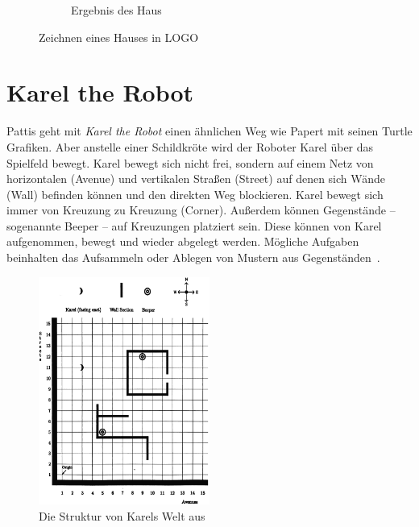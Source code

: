 \begin{figure}
\begin{subfigure}[b]{0.3\textwidth}
        \caption{Ergebnis des Haus}
        \label{fig:related:turtle:house:result}
    \end{subfigure}
    \caption{Zeichnen eines Hauses in LOGO}
    \label{fig:related:turtle:square}
\end{figure}

\section{Karel the Robot}
\label{sec:related:karel}

Pattis geht mit \textit{Karel the Robot} einen ähnlichen Weg wie Papert mit seinen Turtle Grafiken. Aber anstelle einer Schildkröte wird der Roboter Karel über das Spielfeld bewegt. Karel bewegt sich nicht frei, sondern auf einem Netz von horizontalen (Avenue) und vertikalen Straßen (Street) auf denen sich Wände (Wall) befinden können und den direkten Weg blockieren. Karel bewegt sich immer von Kreuzung zu Kreuzung (Corner). Außerdem können Gegenstände -- sogenannte Beeper -- auf Kreuzungen platziert sein. Diese können von Karel aufgenommen, bewegt und wieder abgelegt werden. Mögliche Aufgaben beinhalten das Aufsammeln oder Ablegen von Mustern aus Gegenständen~\cite[1-3]{pattis1981}.

\begin{figure}
    \centering
    \includegraphics[width=0.5\textwidth]{gfx/related-karel.png}
    \caption{Die Struktur von Karels Welt aus~\cite[3]{pattis1981}}
    \label{fig:related:karel}
\end{figure}

